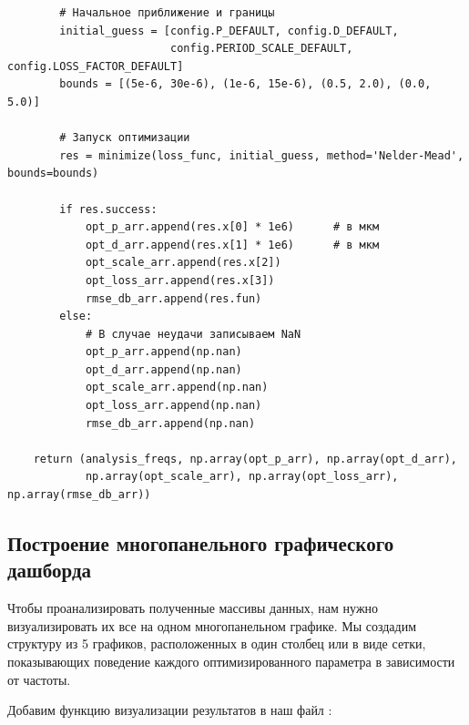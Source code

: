 \begin{listing}[H]
\begin{verbatim}
        # Начальное приближение и границы
        initial_guess = [config.P_DEFAULT, config.D_DEFAULT, 
                         config.PERIOD_SCALE_DEFAULT, config.LOSS_FACTOR_DEFAULT]
        bounds = [(5e-6, 30e-6), (1e-6, 15e-6), (0.5, 2.0), (0.0, 5.0)]
        
        # Запуск оптимизации
        res = minimize(loss_func, initial_guess, method='Nelder-Mead', bounds=bounds)
        
        if res.success:
            opt_p_arr.append(res.x[0] * 1e6)      # в мкм
            opt_d_arr.append(res.x[1] * 1e6)      # в мкм
            opt_scale_arr.append(res.x[2])
            opt_loss_arr.append(res.x[3])
            rmse_db_arr.append(res.fun)
        else:
            # В случае неудачи записываем NaN
            opt_p_arr.append(np.nan)
            opt_d_arr.append(np.nan)
            opt_scale_arr.append(np.nan)
            opt_loss_arr.append(np.nan)
            rmse_db_arr.append(np.nan)
            
    return (analysis_freqs, np.array(opt_p_arr), np.array(opt_d_arr), 
            np.array(opt_scale_arr), np.array(opt_loss_arr), np.array(rmse_db_arr))
\end{verbatim}
\end{listing}

\subsection{Построение многопанельного графического дашборда}

Чтобы проанализировать полученные массивы данных, нам нужно визуализировать их все на одном многопанельном графике. Мы создадим структуру из 5 графиков, расположенных в один столбец или в виде сетки, показывающих поведение каждого оптимизированного параметра в зависимости от частоты.

Добавим функцию визуализации результатов в наш файл :

